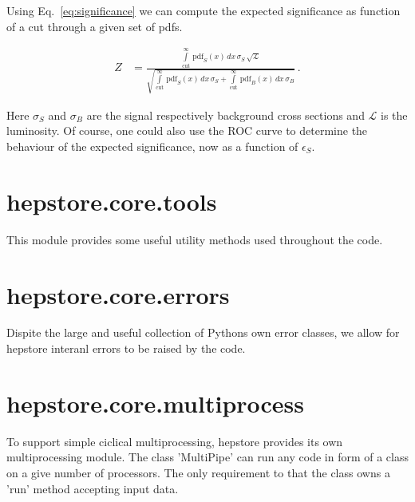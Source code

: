 Using Eq.~\ref{eq:significance} we can compute the expected
significance as function of a cut through a given set of pdfs.
%
\begin{ceqn}
  \begin{align}
     Z &= \frac{
     \int \limits_\text{cut}^\infty \, \text{pdf}_S(x) \,dx
     \, \sigma_S \, \sqrt{\mathcal{L}}
     }{
     \sqrt{
     \int \limits_\text{cut}^\infty \, \text{pdf}_S(x) \,dx
     \, \sigma_S
     + 
     \int \limits_\text{cut}^\infty \, \text{pdf}_B(x) \,dx
     \, \sigma_B
     }}\,.  
     \label{eq:significance}
  \end{align}
\end{ceqn}
%
Here $\sigma_S$ and $\sigma_B$ are the signal respectively background
cross sections and $\mathcal{L}$ is the luminosity. Of course, one
could also use the ROC curve to determine the behaviour of the
expected significance, now as a function of $\epsilon_S$.

\section{hepstore.core.tools}

This module provides some useful utility methods used throughout the
code.
%
\hspace*{0.5cm}
\hspace*{0.5cm}
%

\section{hepstore.core.errors}

Dispite the large and useful collection of Pythons own error classes,
we allow for hepstore interanl errors to be raised by the code.
%
\hspace*{0.5cm}
\hspace*{0.5cm}
%

\section{hepstore.core.multiprocess}

To support simple ciclical multiprocessing, hepstore provides its own
multiprocessing module. The class 'MultiPipe' can run any code in form
of a class on a give number of processors. The only requirement to
that the class owns a 'run' method accepting input data.
